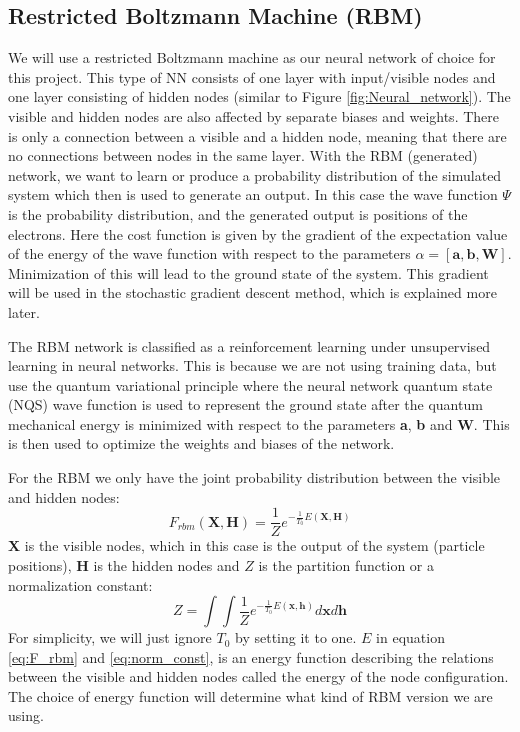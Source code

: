 \documentclass[12pt,a4paper,english]{article}
\begin{document}
\subsection{Restricted Boltzmann Machine (RBM)}
\label{subsect:RBM}
We will use a restricted Boltzmann machine as our neural network of choice for this project. This type of NN consists of one layer with input/visible nodes and one layer consisting of hidden nodes (similar to Figure \ref{fig:Neural_network}). The visible and hidden nodes are also affected by separate biases and weights. There is only a connection between a visible and a hidden node, meaning that there are no connections between nodes in the same layer. With the RBM (generated) network, we want to learn or produce a probability distribution of the simulated system which then is used to generate an output. In this case the wave function $\Psi$ is the probability distribution, and the generated output is positions of the electrons. Here the cost function is given by the gradient of the expectation value of the energy of the wave function with respect to the parameters $\alpha=[\textbf{a}, \textbf{b}, \textbf{W}]$. Minimization of this will lead to the ground state of the system. This gradient will be used in the stochastic gradient descent method, which is explained more later.

The RBM network is classified as a reinforcement learning under unsupervised learning in neural networks. This is because we are not using training data, but use the quantum variational principle where the neural network quantum state (NQS) wave function is used to represent the ground state after the quantum mechanical energy is minimized with respect to the parameters \textbf{a}, \textbf{b} and \textbf{W}. This is then used to optimize the weights and biases of the network. 

For the RBM we only have the joint probability distribution between the visible and hidden nodes:
\begin{equation}
\label{eq:F_rbm}
F_{rbm}(\textbf{X}, \textbf{H})=\frac{1}{Z}e^{-\frac{1}{T_0}E(\textbf{X},\textbf{H})}
\end{equation}
\textbf{X} is the visible nodes, which in this case is the output of the system (particle positions), \textbf{H} is the hidden nodes and $Z$ is the partition function or a normalization constant:
\begin{equation}
\label{eq:norm_const}
Z=\int\int \frac{1}{Z}e^{-\frac{1}{T_0}E(\textbf{x},\textbf{h})}d\textbf{x}d\textbf{h}
\end{equation}
For simplicity, we will just ignore $T_0$ by setting it to one. $E$ in equation \ref{eq:F_rbm} and \ref{eq:norm_const}, is an energy function describing the relations between the visible and hidden nodes called the energy of the node configuration. The choice of energy function will determine what kind of RBM version we are using. 
\end{document}

